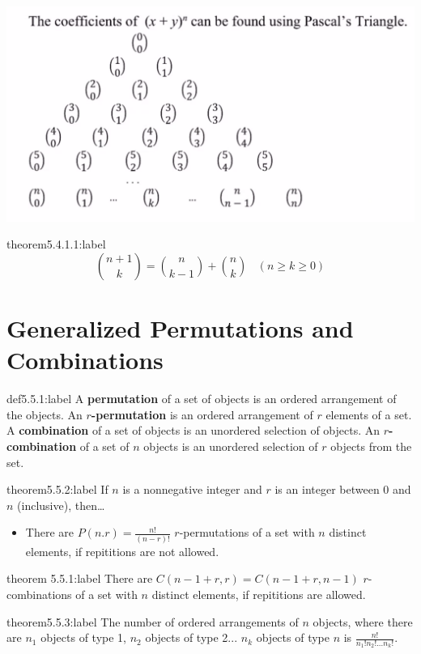 \begin{center}
    \includegraphics[width=1\textwidth]{chapters/ch5/images/fig5.4.1.PNG}
\end{center}


\begin{theorem}{theorem5.4.1.1:label}
    \[
        \binom{n+1}{k} = \binom{n}{k-1} + \binom{n}{k} \:\:\:\: (n \ge k \ge 0)
    \]
\end{theorem}


\section{Generalized Permutations and Combinations}

\begin{definition}{def5.5.1:label}
    A \textbf{permutation} of a set of objects is an ordered arrangement of the objects. An \textbf{$r$-permutation} is an ordered arrangement of $r$ elements of a set. \\

    A \textbf{combination} of a set of objects is an unordered selection of objects. An \textbf{$r$-combination} of a set of $n$ objects is an unordered selection of $r$ objects from the set.
\end{definition}

\begin{theorem}{theorem5.5.2:label}
    If $n$ is a nonnegative integer and $r$ is an integer between 0 and $n$ (inclusive), then\dots

    \begin{itemize}
        \item There are $P(n.r)=\frac{n!}{(n-r)!}$ $r$-permutations of a set with $n$ distinct elements, if repititions are not allowed. 
    \end{itemize}
\end{theorem}

\begin{theorem}{theorem 5.5.1:label}
    There are $C(n-1+r,r)=C(n-1+r,n-1)$ $r$-combinations of a set with $n$ distinct elements, if repititions are allowed.
\end{theorem}

\begin{theorem}{theorem5.5.3:label}
    The number of ordered arrangements of $n$ objects, where there are $n_1$ objects of type 1, $n_2$ objects of type 2... $n_k$ objects of type $n$ is $\frac{n!}{n_1!n_2!...n_k!}$.
\end{theorem}